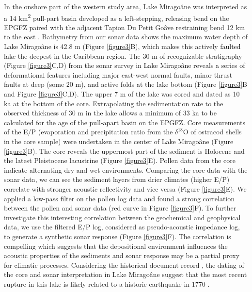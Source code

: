 \documentclass{nature}
\begin{document}
In the onshore part of the western study area, Lake Mirago\^ane was interpreted as a 14 km\textsuperscript{2} pull-part basin developed as a left-stepping, releasing bend on the EPGFZ paired with the adjacent Tapion Du Petit Go\^ave restraining bend 12 km to the east \citep{cowgill2012interactive}. Bathymetry from our sonar data shows the maximum water depth of Lake Mirago\^ane is 42.8 m (Figure \ref{figure3}B), which makes this actively faulted lake the deepest \citep{higuera199910} in the Caribbean region. The 30 m of recognizable stratigraphy (Figure \ref{figure3}C,D) from the sonar survey in Lake Mirago\^ane reveals a series of deformational features including major east-west normal faults, minor thrust faults at deep (some 20 m), and active folds at the lake bottom (Figure \ref{figure3}B and Figure \ref{figure3}C,D). The upper 7 m of the lake was cored and dated as 10 ka at the bottom of the core. Extrapolating the sedimentation rate to the observed thickness of 30 m in the lake allows a minimum of 33 ka to be calculated for the age of the pull-apart basin on the EPGFZ. Core measurements of the E/P (evaporation and precipitation ratio from the $\delta^{18}$O of ostracod shells in the core sample) were undertaken \citep{higuera199910} in the center of Lake Mirago\^ane (Figure \ref{figure3}B). The core reveals the uppermost part of the sediment is Holocene and the latest Pleistocene lacustrine (Figure \ref{figure3}E). Pollen data from the core indicate alternating dry and wet environments. Comparing the core data with the sonar data, we can see the sediment layers from drier climates (higher E/P) correlate with stronger acoustic reflectivity and vice versa (Figure \ref{figure3}E). We applied a low-pass filter on the pollen log data and found a strong correlation between the pollen and sonar data (red curve in Figure \ref{figure3}F). To further investigate this interesting correlation between the geochemical and geophysical data, we use the filtered E/P log, considered as pseudo-acoustic impedance log, to generate a synthetic sonar response (Figure \ref{figure3}F). The correlation is compelling which suggests that the depositional environment influences the acoustic properties of the sediments and sonar response may be a partial proxy for climatic processes. Considering the historical document record \citep{bakun2012significant}, the dating of the core and sonar interpretation in Lake Mirago\^ane suggest that the most recent rupture in this lake is likely related to a historic earthquake in 1770 \citep{bakun2012significant}.
\end{document}

